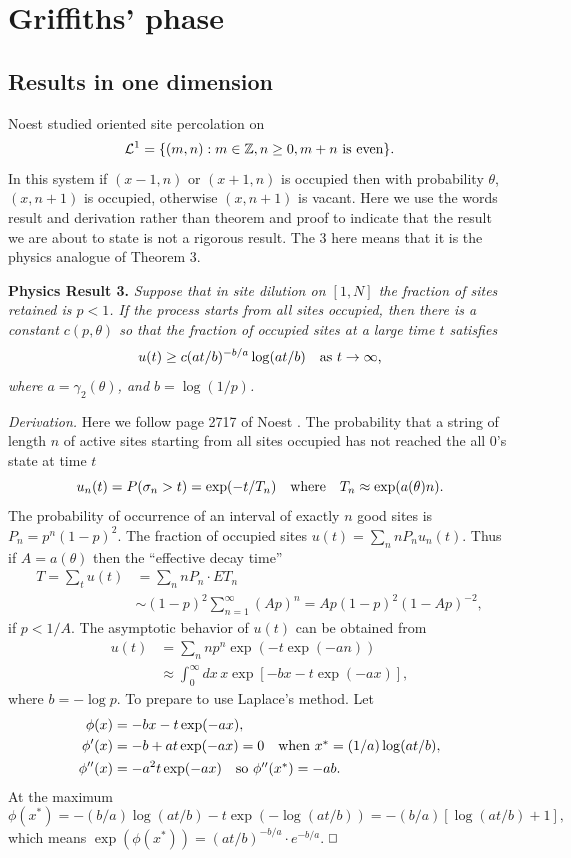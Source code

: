 \documentclass[11pt]{article}
\def\clearp{}
\theoremstyle{definition}
\def\beq{ \begin{equation} }
\def\eeq{ \end{equation} }
\def\mn{\medskip\noindent}
\def\square{\vcenter{\vbox{\hrule height .4pt
  \hbox{\vrule width .4pt height 5pt \kern 5pt
        \vrule width .4pt} \hrule height .4pt}}}
\def\eopt{\hfill$\square$}
\def\ZZ{\mathbb{Z}}
\begin{document}
\clearp

\section{Griffiths' phase}

\subsection{\bf Results in one dimension}


Noest \cite{Noe88} studied oriented site percolation on 
$$
{\cal L}^1 = \{ (m,n) : m \in \ZZ, n \ge 0, m+n \hbox{ is even}\}.
$$ In this system if $(x-1,n)$ or $(x+1,n)$ is occupied then with probability $\theta$, $(x,n+1)$ is occupied, otherwise $(x,n+1)$ is vacant. Here we use the words result and derivation rather than theorem and proof to indicate that the result we are about to state is not a rigorous result. The 3 here means that it is the physics analogue of Theorem 3.

\mn
{\bf Physics Result 3.}
{\it Suppose that in site dilution on $[1,N]$ the fraction of sites retained is $p<1$.  If the process starts from all sites occupied, then there is a constant $c(p,\theta)$ so that the fraction of occupied sites at a large time $t$ satisfies
\beq
u(t) \ge c  (at/b)^{-b/a} \log(at/b) \quad\hbox{as $t\to\infty$,}
\label{Noestasy}
\eeq
where $a=\gamma_2(\theta)$, and $b = \log(1/p)$. }


\mn
{\it Derivation.} Here we follow page 2717 of Noest \cite{Noe88}. 
The probability that a string of length $n$ of active sites starting from all sites occupied has not reached the all 0's state at time $t$
$$
u_n(t) = P( \sigma_n > t ) = \exp(-t/T_n) \quad\hbox{where}\quad 
T_n \approx \exp(a(\theta) n).
$$
The probability of occurrence of an interval of exactly $n$ good sites is $P_n=p^n(1-p)^2$.
The fraction of occupied sites 
$u(t) = \sum_n n P_nu_n(t)$. 
Thus if $A=a(\theta)$ then the ``effective decay time'' 
\begin{align*}
T=\sum _t u(t) &=\sum_n nP_n \cdot ET_n \\
&\sim (1-p)^2 \sum_{n=1}^\infty  (Ap)^n  = Ap(1-p)^2(1-Ap)^{-2},
\end{align*}
if $p<1/A$. The asymptotic behavior of $u(t)$ can be obtained from 
\begin{align}
u(t) & = \sum_n n p^n \exp(-t \exp(-an) )
\nonumber \\
& \approx \int_0^\infty dx\,  x \exp[-bx - t\exp(-ax)],
\label{Neq4}
\end{align}
where $b=-\log p$. To prepare to use Laplace's method. 
Let 
\begin{align*}
\phi(x) & = -bx - t \exp(-ax) ,\\ 
\phi'(x) & = -b +at \exp(-ax) = 0 \quad\hbox{when $x^*=(1/a) \log(at/b)$}, \\
\phi''(x) & = -a^2t\exp(-ax) \quad \hbox{so $\phi''(x^*) = -ab$}.
\end{align*}
At the maximum 
$$
\phi(x^*) = -(b/a) \log(at/b)  -t \exp(-\log(at/b)) = -(b/a) [\log(at/b) +1],
$$
which means $\exp(\phi(x^*)) = (at/b)^{-b/a} \cdot e^{-b/a}$.
\eopt
\end{document}
